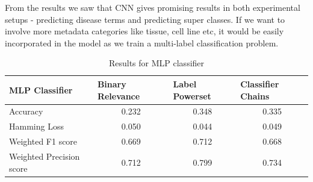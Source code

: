 From the results we saw that CNN gives promising results in both experimental setups - predicting disease terms and predicting super classes. If we want to involve more metadata categories like tissue, cell line etc, it would be easily incorporated in the model as we train a multi-label classification problem. 





\iffalse
\begin{table}[!htb]
\begin{tabular}{|l|c|c|c|}
\hline
MLP Classifier           & \multicolumn{1}{l|}{Binary Relevance} & \multicolumn{1}{l|}{Label Powerset} & \multicolumn{1}{l|}{Classifier Chains} \\ \hline
Accuracy                 & 0.232                                 & 0.348                               & 0.335                                  \\ \hline
Hamming Loss             & 0.050                                 & 0.044                               & 0.049                                  \\ \hline
Weighted F1 score        & 0.669                                 & 0.712                               & 0.668                                  \\ \hline
Weighted Precision score & 0.712                                 & 0.799                               & 0.734                                  \\ \hline
\end{tabular}
\caption{Results for MLP classifier}
\label{table:MLP}
\end{table}





